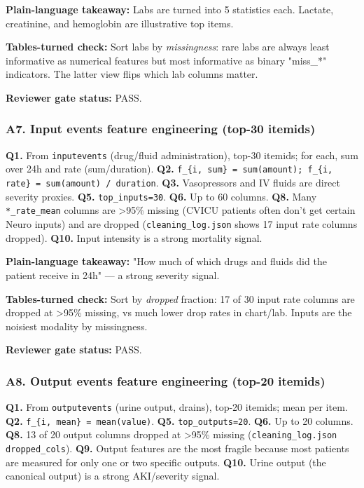 \documentclass{article}
\begin{document}
\textbf{Plain-language takeaway:} Labs are turned into 5 statistics each. Lactate, creatinine, and hemoglobin are illustrative top items.


\textbf{Tables-turned check:} Sort labs by \emph{missingness}: rare labs are always least informative as numerical features but most informative as binary "miss\_*" indicators. The latter view flips which lab columns matter.


\textbf{Reviewer gate status:} PASS.


\subsubsection{A7. Input events feature engineering (top-30 itemids)}


\textbf{Q1.} From \texttt{inputevents} (drug/fluid administration), top-30 itemids; for each, sum over 24h and rate (sum/duration). \textbf{Q2.} \texttt{f\_\{i, sum\} = sum(amount); f\_\{i, rate\} = sum(amount) / duration}. \textbf{Q3.} Vasopressors and IV fluids are direct severity proxies. \textbf{Q5.} \texttt{top\_inputs=30}. \textbf{Q6.} Up to 60 columns. \textbf{Q8.} Many \texttt{*\_rate\_mean} columns are >95\% missing (CVICU patients often don't get certain Neuro inputs) and are dropped (\texttt{cleaning\_log.json} shows 17 input rate columns dropped). \textbf{Q10.} Input intensity is a strong mortality signal.


\textbf{Plain-language takeaway:} "How much of which drugs and fluids did the patient receive in 24h" --- a strong severity signal.


\textbf{Tables-turned check:} Sort by \emph{dropped} fraction: 17 of 30 input rate columns are dropped at >95\% missing, vs much lower drop rates in chart/lab. Inputs are the noisiest modality by missingness.


\textbf{Reviewer gate status:} PASS.


\subsubsection{A8. Output events feature engineering (top-20 itemids)}


\textbf{Q1.} From \texttt{outputevents} (urine output, drains), top-20 itemids; mean per item. \textbf{Q2.} \texttt{f\_\{i, mean\} = mean(value)}. \textbf{Q5.} \texttt{top\_outputs=20}. \textbf{Q6.} Up to 20 columns. \textbf{Q8.} 13 of 20 output columns dropped at >95\% missing (\texttt{cleaning\_log.json} \texttt{dropped\_cols}). \textbf{Q9.} Output features are the most fragile because most patients are measured for only one or two specific outputs. \textbf{Q10.} Urine output (the canonical output) is a strong AKI/severity signal.
\end{document}
